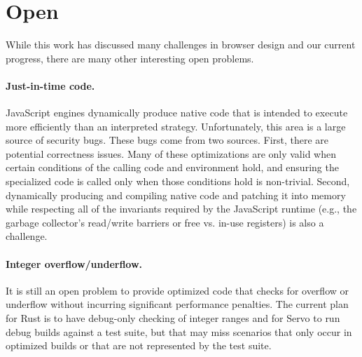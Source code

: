 
\section{Open}
\label{sec:open}
While this work has discussed many challenges in browser design and our current progress,
there are many other interesting open problems.

\paragraph{Just-in-time code.} JavaScript engines dynamically produce native code that is
intended to execute more efficiently than an interpreted strategy.
Unfortunately, this area is a large source of security bugs.
These bugs come from two sources.
First, there are potential correctness issues.
Many of these optimizations are only valid when certain conditions of the calling
code and environment hold, and ensuring the specialized code is called only when those
conditions hold is non-trivial.
Second, dynamically producing and compiling native code and patching it into memory
while respecting all of the invariants required by the JavaScript runtime (e.g., the
garbage collector's read/write barriers or free vs. in-use registers) is also a challenge.

\paragraph{Integer overflow/underflow.} It is still an open problem
to provide optimized code that checks for overflow or underflow without
incurring significant performance penalties.
The current plan for Rust is to have debug-only checking of integer ranges
and for Servo to run debug builds against a test suite, but that may miss
scenarios that only occur in optimized builds or that are not represented
by the test suite.

